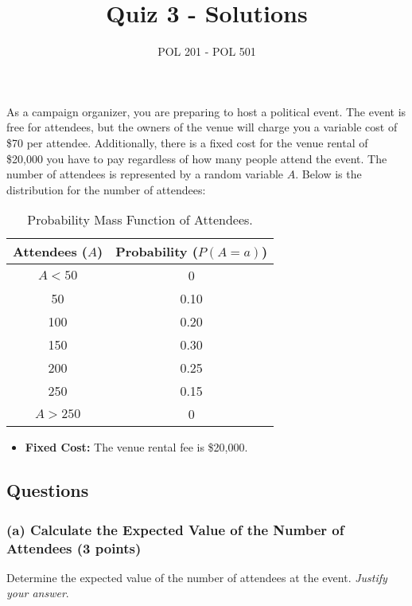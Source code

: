 \documentclass{article}
\title{Quiz 3 - Solutions}
\author{POL 201 - POL 501}
\date{}
\begin{document}
\maketitle

As a campaign organizer, you are preparing to host a political event. The event is free for attendees, but the owners of the venue will charge you a variable cost of \$70 per attendee. Additionally, there is a fixed cost for the venue rental of \$20,000 you have to pay regardless of how many people attend the event. The number of attendees is represented by a random variable $A$. Below is the distribution for the number of attendees:

\begin{table}[h!]
\centering
\begin{tabular}{c|c}
    \hline 
    Attendees ($A$) & Probability ($P(A = a)$) \\
    \hline
    $A < 50$ & 0 \\
    50 & 0.10 \\
    100 & 0.20 \\
    150 & 0.30 \\
    200 & 0.25 \\
    250 & 0.15 \\
    $A > 250$ & 0 \\
    \hline 
\end{tabular}
\caption{Probability Mass Function of Attendees.}
\end{table}
\begin{itemize}
    \item \textbf{Fixed Cost:} The venue rental fee is \$20,000.
\end{itemize}

\subsection*{Questions}

\subsubsection*{(a) Calculate the Expected Value of the Number of Attendees (3 points)}

Determine the expected value of the number of attendees at the event. \emph{Justify your answer}.

\begin{center}
\end{center}
\end{document}
